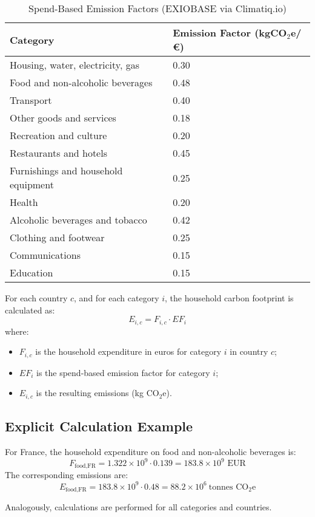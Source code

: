 \documentclass[12pt,a4paper]{article}%
\begin{document}
\begin{table}[h]
\centering
\caption{Spend-Based Emission Factors (EXIOBASE via Climatiq.io)}
\label{tab:efactors}
\begin{tabular}{@{}ll@{}}
\toprule
\textbf{Category} & \textbf{Emission Factor (kgCO$_{2}$e/€)}\\
\midrule
Housing, water, electricity, gas & 0.30\\
Food and non-alcoholic beverages & 0.48\\
Transport & 0.40\\
Other goods and services & 0.18\\
Recreation and culture & 0.20\\
Restaurants and hotels & 0.45\\
Furnishings and household equipment & 0.25\\
Health & 0.20\\
Alcoholic beverages and tobacco & 0.42\\
Clothing and footwear & 0.25\\
Communications & 0.15\\
Education & 0.15\\
\bottomrule
\end{tabular}
\end{table}

For each country $c$, and for each category $i$, the household carbon footprint is calculated as:
\[
E_{i,c} = F_{i,c} \cdot EF_i
\]
where:
\begin{itemize}
    \item $F_{i,c}$ is the household expenditure in euros for category $i$ in country $c$;
    \item $EF_i$ is the spend-based emission factor for category $i$;
    \item $E_{i,c}$ is the resulting emissions (kg CO$_{2}$e).
\end{itemize}

\subsection{Explicit Calculation Example}

For France, the household expenditure on food and non-alcoholic beverages is:
\[
F_{\text{food,FR}} = 1.322 \times 10^9 \cdot 0.139 = 183.8 \times 10^9 \text{ EUR}
\]
The corresponding emissions are:
\[
E_{\text{food,FR}} = 183.8 \times 10^9 \cdot 0.48 = 88.2 \times 10^6 \ \text{tonnes CO}_{2}\text{e}
\]

Analogously, calculations are performed for all categories and countries.
\end{document}
